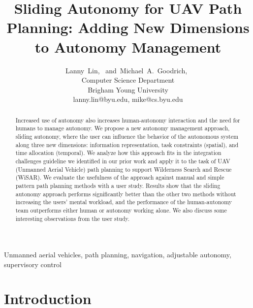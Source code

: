 \documentclass[journal]{IEEEtran}
\begin{document}
\title{Sliding Autonomy for UAV Path Planning: Adding New Dimensions to Autonomy Management}

\author{
Lanny~Lin,~
and~Michael~A.~Goodrich,~%
\\Computer Science Department \\ Brigham Young University \\ lanny.lin@byu.edu, mike@cs.byu.edu
}

\maketitle

\begin{abstract}
Increased use of autonomy also increases human-autonomy interaction and the need for humans to manage autonomy. We propose a new autonomy management approach, sliding autonomy, where the user can influence the behavior of the autonomous system along three new dimensions: information representation, task constraints (spatial), and time allocation (temporal). We analyze how this approach fits in the integration challenges guideline we identified in our prior work and apply it to the task of UAV (Unmanned Aerial Vehicle) path planning to support Wilderness Search and Rescue (WiSAR). We evaluate the usefulness of the approach against manual and simple pattern path planning methods with a user study. Results show that the sliding autonomy approach performs significantly better than the other two methods without increasing the users' mental workload, and the performance of the human-autonomy team outperforms either human or autonomy working alone. We also discuss some interesting observations from the user study.
\end{abstract}


\begin{IEEEkeywords}
Unmanned aerial vehicles, path planning, navigation, adjustable autonomy, supervisory control
\end{IEEEkeywords}

\IEEEpeerreviewmaketitle


\section{Introduction}
\label{sec:Introduction6}
\end{document}
